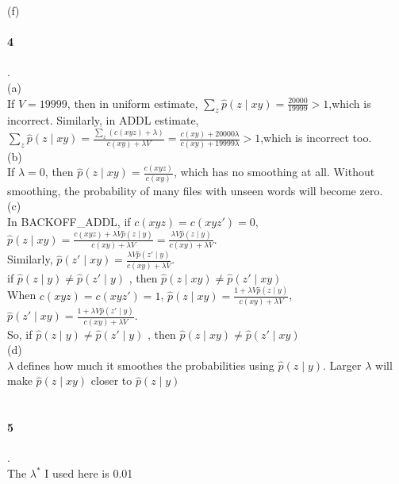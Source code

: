\documentclass[11pt]{article}
\begin{document}
(f)\\

\paragraph{4}.\\
(a)\\
If $V=19999$, then in uniform estimate, $\sum_z \hat{p}(z\mid x y)=\frac{20000}{19999}>1$,which is incorrect. Similarly, in ADDL estimate, $\sum_z \hat{p}(z\mid x y)=\frac{\sum_z (c(xyz)+\lambda)}{c(xy)+\lambda V}=\frac{c(xy)+20000\lambda}{c(xy)+19999\lambda}>1$,which is incorrect too.\\
(b)\\
If $\lambda=0$, then $\hat{p}(z\mid x y)=\frac{c(xyz)}{c(xy)}$, which has no smoothing at all. Without smoothing, the probability of many files with unseen words will become zero.\\
(c)\\
In BACKOFF\_ADDL, if $c(xyz)=c(xyz')=0$, $\hat{p}(z\mid x y)=\frac{c(xyz)+\lambda V \hat{p}(z\mid y)}{c(xy)+\lambda V}=\frac{\lambda V \hat{p}(z\mid y)}{c(xy)+\lambda V}$.\\
Similarly, $\hat{p}(z'\mid x y)=\frac{\lambda V \hat{p}(z'\mid y)}{c(xy)+\lambda V}$.\\
if $\hat{p}(z\mid y)\neq \hat{p}(z'\mid y)$ , then $\hat{p}(z\mid x y)\neq \hat{p}(z'\mid x y)$\\
When $c(xyz)=c(xyz')=1$, $\hat{p}(z\mid x y)=\frac{1+\lambda V \hat{p}(z\mid y)}{c(xy)+\lambda V}$, $\hat{p}(z'\mid x y)=\frac{1+\lambda V \hat{p}(z'\mid y)}{c(xy)+\lambda V}$.\\
So, if $\hat{p}(z\mid y)\neq \hat{p}(z'\mid y)$ , then $\hat{p}(z\mid x y)\neq \hat{p}(z'\mid x y)$\\

(d)\\
$\lambda$ defines how much it smoothes the probabilities using $\hat{p}(z\mid y)$. Larger $\lambda$ will make $\hat{p}(z\mid x y)$ closer to $\hat{p}(z\mid y)$\\
\\


\paragraph{5}.\\
The $\lambda^*$ I used here is 0.01\\
\\
\end{document}
